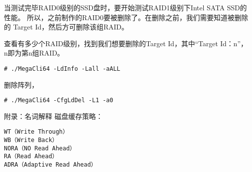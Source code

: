 当测试完毕RAID0级别的SSD盘时，要开始测试RAID1级别下Intel SATA SSD的性能。
所以，之前制作的RAID0要被删除了。在删除之前，我们需要知道被删除的
Target Id，然后方可删除该组RAID。

查看有多少个RAID级别，找到我们想要删除的Target Id，其中“Target Id：n”，
n即为第n组RAID。

\begin{verbatim}
# ./MegaCli64 -LdInfo -Lall -aALL 
\end{verbatim}

删除阵列，
\begin{verbatim}
# ./MegaCli64 -CfgLdDel -L1 -a0
\end{verbatim}
	
附录：名词解释
磁盘缓存策略：
\begin{verbatim}
WT（Write Through）
WB（Write Back）
NORA（NO Read Ahead）
RA（Read Ahead）
ADRA（Adaptive Read Ahead）
\end{verbatim}


